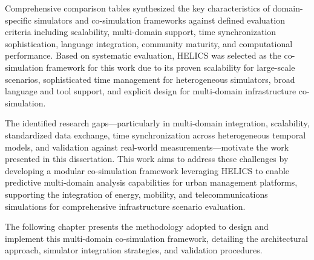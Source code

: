 Comprehensive comparison tables synthesized the key characteristics of domain-specific simulators and co-simulation frameworks against defined evaluation criteria including scalability, multi-domain support, time synchronization sophistication, language integration, community maturity, and computational performance. Based on systematic evaluation, HELICS was selected as the co-simulation framework for this work due to its proven scalability for large-scale scenarios, sophisticated time management for heterogeneous simulators, broad language and tool support, and explicit design for multi-domain infrastructure co-simulation.

The identified research gaps—particularly in multi-domain integration, scalability, standardized data exchange, time synchronization across heterogeneous temporal models, and validation against real-world measurements—motivate the work presented in this dissertation. This work aims to address these challenges by developing a modular co-simulation framework leveraging HELICS to enable predictive multi-domain analysis capabilities for urban management platforms, supporting the integration of energy, mobility, and telecommunications simulations for comprehensive infrastructure scenario evaluation.

The following chapter presents the methodology adopted to design and implement this multi-domain co-simulation framework, detailing the architectural approach, simulator integration strategies, and validation procedures.



